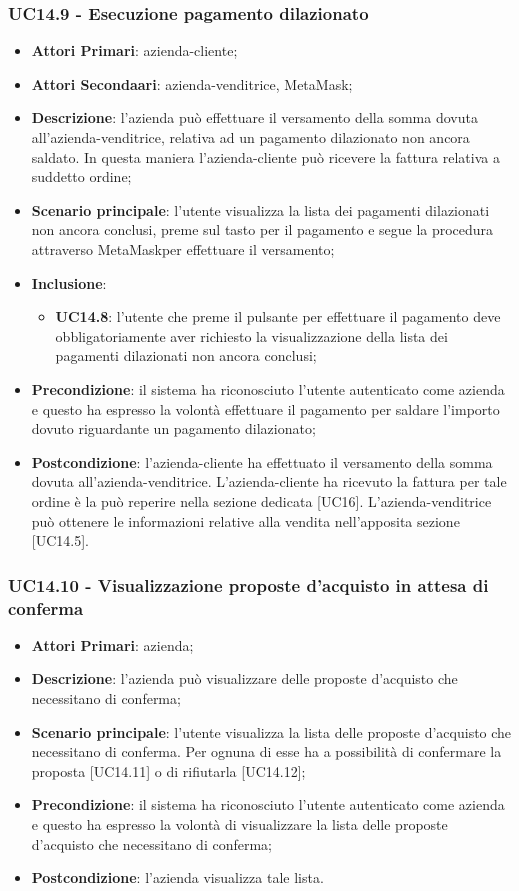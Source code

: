\subsubsection{UC14.9 - Esecuzione pagamento dilazionato}
\begin{itemize}
	\item \textbf{Attori Primari}: azienda-cliente;
	\item \textbf{Attori Secondaari}: azienda-venditrice, MetaMask\glo;
	\item \textbf{Descrizione}: l'azienda può effettuare il versamento della somma dovuta all'azienda-venditrice, relativa ad un pagamento dilazionato non ancora saldato. In questa maniera l'azienda-cliente può ricevere la fattura relativa a suddetto ordine;
	\item \textbf{Scenario principale}: l'utente visualizza la lista dei pagamenti dilazionati non ancora conclusi, preme sul tasto per il pagamento e segue la procedura attraverso MetaMask\glosp per effettuare il versamento;
	\item \textbf{Inclusione}: 
	\begin{itemize}
		\item \textbf{UC14.8}: l'utente che preme il pulsante per effettuare il pagamento deve obbligatoriamente aver richiesto la visualizzazione della lista dei pagamenti dilazionati non ancora conclusi;
	\end{itemize}
	\item \textbf{Precondizione}: il sistema ha riconosciuto l'utente autenticato come azienda e questo ha espresso la volontà effettuare il pagamento per saldare l'importo dovuto riguardante un pagamento dilazionato;
	\item \textbf{Postcondizione}: l'azienda-cliente ha effettuato il versamento della somma dovuta all'azienda-venditrice. L'azienda-cliente ha ricevuto la fattura per tale ordine è la può reperire nella sezione dedicata [UC16]. L'azienda-venditrice può ottenere le informazioni relative alla vendita nell'apposita sezione [UC14.5].
\end{itemize}
\subsubsection{UC14.10 - Visualizzazione proposte d'acquisto in attesa di conferma}
\begin{itemize}
	\item \textbf{Attori Primari}: azienda;
	\item \textbf{Descrizione}: l'azienda può visualizzare delle proposte d'acquisto che necessitano di conferma;
	\item \textbf{Scenario principale}: l'utente visualizza la lista delle proposte d'acquisto che necessitano di conferma. Per ognuna di esse ha a possibilità di confermare la proposta [UC14.11] o di rifiutarla [UC14.12];
	\item \textbf{Precondizione}: il sistema ha riconosciuto l'utente autenticato come azienda e questo ha espresso la volontà di visualizzare la lista delle proposte d'acquisto che necessitano di conferma;
	\item \textbf{Postcondizione}: l'azienda visualizza tale lista.
\end{itemize}
